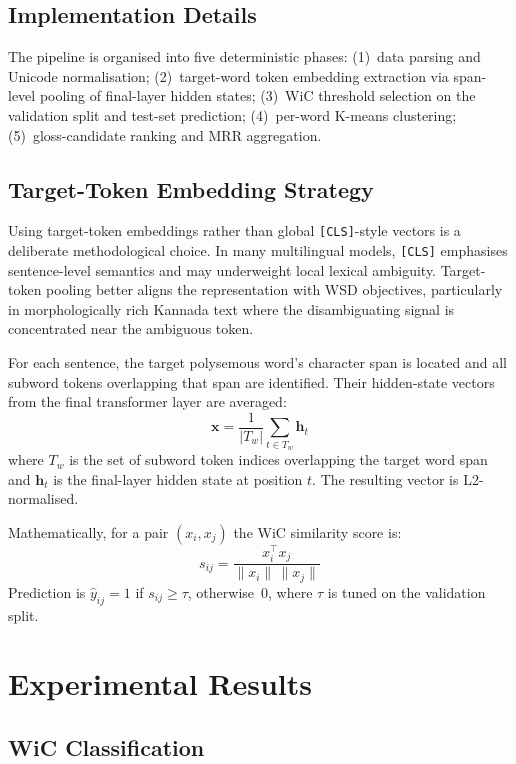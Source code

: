 \documentclass[conference]{IEEEtran}
\begin{document}
\subsection{Implementation Details}

The pipeline is organised into five deterministic phases:
(1)~data parsing and Unicode normalisation;
(2)~target-word token embedding extraction via span-level pooling of final-layer
hidden states;
(3)~WiC threshold selection on the validation split and test-set prediction;
(4)~per-word K-means clustering;
(5)~gloss-candidate ranking and MRR aggregation.

\subsection{Target-Token Embedding Strategy}

Using target-token embeddings rather than global \texttt{[CLS]}-style vectors
is a deliberate methodological choice.
In many multilingual models, \texttt{[CLS]} emphasises sentence-level
semantics and may underweight local lexical ambiguity.
Target-token pooling better aligns the representation with WSD objectives,
particularly in morphologically rich Kannada text where the disambiguating
signal is concentrated near the ambiguous token.

For each sentence, the target polysemous word's character span is located
and all subword tokens overlapping that span are identified.
Their hidden-state vectors from the final transformer layer are averaged:
\[
\mathbf{x} = \frac{1}{|T_w|}\sum_{t \in T_w} \mathbf{h}_t
\]
where $T_w$ is the set of subword token indices overlapping the target word
span and $\mathbf{h}_t$ is the final-layer hidden state at position $t$.
The resulting vector is L2-normalised.

Mathematically, for a pair $(x_i, x_j)$ the WiC similarity score is:
\[
s_{ij} = \frac{x_i^\top x_j}{\|x_i\|\,\|x_j\|}
\]
Prediction is $\hat{y}_{ij}=1$ if $s_{ij}\geq\tau$, otherwise~$0$, where
$\tau$ is tuned on the validation split.

\section{Experimental Results}

\subsection{WiC Classification}
\end{document}
